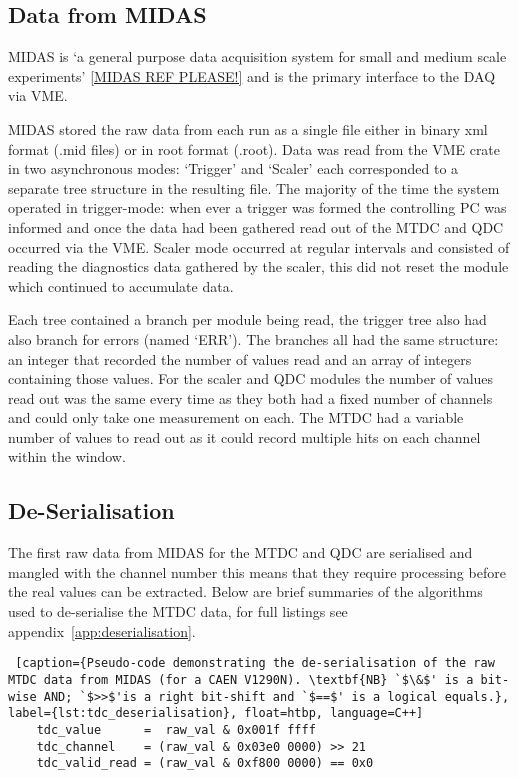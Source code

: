 \documentclass[]{article}
\begin{document}
\subsection{Data from MIDAS} %
\label{sub:data_from_midas}
MIDAS is `a general purpose data acquisition system for small and medium scale experiments' \ref{MIDAS REF PLEASE!} and is the primary interface to the DAQ via VME. 

MIDAS stored the raw data from each run as a single file either in binary xml format (.mid files) or in root format (.root). Data was read from the VME crate in two asynchronous modes: `Trigger' and `Scaler' each corresponded to a separate tree structure in the resulting file. The majority of the time the system operated in trigger-mode: when ever a trigger was formed the controlling PC was informed and once the data had been gathered read out of the MTDC and QDC occurred via the VME. Scaler mode occurred at regular intervals and consisted of reading the diagnostics data gathered by the scaler, this did not reset the module which continued to accumulate data. 

Each tree contained a branch per module being read, the trigger tree also had also branch for errors (named `ERR'). The branches all had the same structure: an integer that recorded the number of values read and an array of integers containing those values. For the scaler and QDC modules the number of values read out was the same every time as they both had a fixed number of channels and could only take one measurement on each. The MTDC had a variable number of values to read out as it could record multiple hits on each channel within the window.
\subsection{De-Serialisation} %
\label{sub:de_serialisation}
The first raw data from MIDAS for the MTDC and QDC are serialised and mangled with the channel number this means that they require processing before the real values can be extracted. Below are brief summaries of the algorithms used to de-serialise the MTDC data, for full listings see appendix~\ref{app:deserialisation}.
%
\begin{center}
\begin{lstlisting} [caption={Pseudo-code demonstrating the de-serialisation of the raw MTDC data from MIDAS (for a CAEN V1290N). \textbf{NB} `$\&$' is a bit-wise AND; `$>>$'is a right bit-shift and `$==$' is a logical equals.}, label={lst:tdc_deserialisation}, float=htbp, language=C++]
    tdc_value      =  raw_val & 0x001f ffff
    tdc_channel    = (raw_val & 0x03e0 0000) >> 21
    tdc_valid_read = (raw_val & 0xf800 0000) == 0x0
\end{lstlisting}
\end{center}
\end{document}
